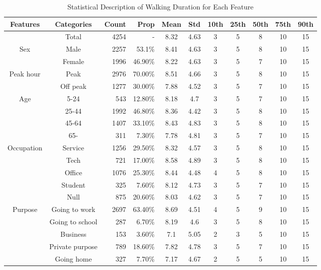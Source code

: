 \documentclass[sustainability,article,submit,moreauthors,pdftex,10pt,a4paper]{Definitions/mdpi}
\begin{document}
\begin{table}[h]
	\caption{Statistical Description of Walking Duration for Each Feature}
	\label{table:StatisticalDescription}
	\centering
	\small
	\renewcommand{\arraystretch}{1.25}
	\begin{tabular}{ccrrccccccc}
		\toprule
		Features & Categories & Count & Prop & Mean & Std & 10th & 25th & 50th & 75th & 90th\\
		\midrule
		& Total    & 4254  & - & 8.32  & 4.63  & 3     & 5     & 8     & 10    & 15 \\
		\midrule
		\multicolumn{1}{c}{Sex}
		& Male     & 2257  & 53.1\%    & 8.41  & 4.63  & 3     & 5     & 8     & 10    & 15 \\
		& Female   & 1996  & 46.90\%   & 8.22  & 4.63  & 3     & 5     & 7     & 10    & 15 \\
		\midrule
		\multicolumn{1}{c}{Peak hour}
		& Peak     & 2976  & 70.00\%   & 8.51  & 4.66  & 3     & 5     & 8     & 10    & 15 \\
		& Off peak & 1277  & 30.00\%   & 7.88  & 4.52  & 3     & 5     & 7     & 10    & 15 \\
		\midrule
		\multicolumn{1}{c}{Age}
		& 5-24     & 543   & 12.80\%   & 8.18  & 4.7   & 3     & 5     & 7     & 10    & 15 \\
		& 25-44    & 1992  & 46.80\%   & 8.36  & 4.42  & 3     & 5     & 8     & 10    & 15 \\
		& 45-64    & 1407  & 33.10\%   & 8.43  & 4.83  & 3     & 5     & 8     & 10    & 15 \\
		& 65-      & 311   &  7.30\%   & 7.78  & 4.81  & 3     & 5     & 7     & 10    & 15 \\
		\midrule
		\multicolumn{1}{c}{Occupation}
		& Service  & 1256  & 29.50\%   & 8.32  & 4.57  & 3     & 5     & 8     & 10    & 15 \\
		& Tech     & 721   & 17.00\%   & 8.58  & 4.89  & 3     & 5     & 8     & 10    & 15 \\
		& Office   & 1076  & 25.30\%   & 8.44  & 4.48  & 4     & 5     & 8     & 10    & 15 \\
		& Student  & 325   &  7.60\%   & 8.12  & 4.73  & 3     & 5     & 7     & 10    & 15 \\
		& Null     & 875   & 20.60\%   & 8.03  & 4.62  & 3     & 5     & 7     & 10    & 15 \\
		\midrule
		\multicolumn{1}{c}{Purpose}
		& Going to work   & 2697  & 63.40\% & 8.69  & 4.51  & 4     & 5     & 9     & 10    & 15 \\
		& Going to school & 287   &  6.70\% & 8.19  & 4.6   & 3     & 5     & 8     & 10    & 15 \\
		& Business   & 153   &  3.60\% & 7.1   & 5.05  & 2     & 3     & 5     & 10    & 15 \\
		& Private purpose     & 789   & 18.60\% & 7.82  & 4.78  & 3     & 5     & 7     & 10    & 15 \\
		& Going home          & 327   &  7.70\% & 7.17  & 4.67  & 2     & 5     & 5     & 10    & 15 \\
		\bottomrule
	\end{tabular}
	\normalsize
\end{table}
\end{document}
